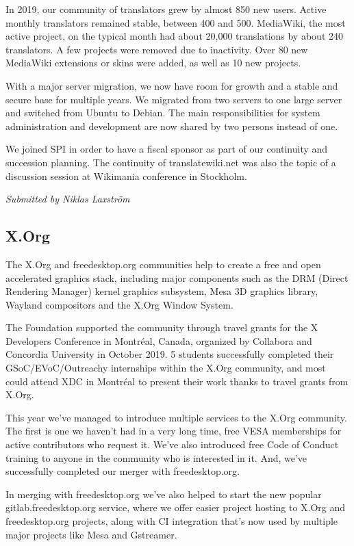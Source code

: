 \documentclass[a4paper]{report}
\begin{document}
In 2019, our community of translators grew by almost 850 new users.
Active monthly translators remained stable, between 400 and 500.
MediaWiki, the most active project, on the typical month had about
20,000 translations by about 240 translators. A few projects were
removed due to inactivity. Over 80 new MediaWiki extensions or skins
were added, as well as 10 new projects.

With a major server migration, we now have room for growth and a stable
and secure base for multiple years. We migrated from two servers to one
large server and switched from Ubuntu to Debian. The main
responsibilities for system administration and development are now
shared by two persons instead of one.

We joined SPI in order to have a fiscal sponsor as part of our
continuity and succession planning. The continuity of translatewiki.net
was also the topic of a discussion session at Wikimania conference in
Stockholm.

{\em Submitted by Niklas Laxström}

\subsection{X.Org}

The X.Org and freedesktop.org communities help to create a free and open
accelerated graphics stack, including major components such as the DRM
(Direct Rendering Manager) kernel graphics subsystem, Mesa 3D graphics
library, Wayland compositors and the X.Org Window System.

The Foundation supported the community through travel grants for the X
Developers Conference in Montréal, Canada, organized by Collabora and
Concordia University in October 2019. 5 students successfully completed
their GSoC/EVoC/Outreachy internships within the X.Org community, and
most could attend XDC in Montréal to present their work thanks to travel
grants from X.Org.

This year we've managed to introduce multiple services to the X.Org
community.  The first is one we haven't had in a very long time, free
VESA memberships for active contributors who request it. We've also
introduced free Code of Conduct training to anyone in the community who
is interested in it. And, we've successfully completed our merger with
freedesktop.org.

In merging with freedesktop.org we've also helped to start the new
popular gitlab.freedesktop.org service, where we offer easier project
hosting to X.Org and freedesktop.org projects, along with CI integration
that's now used by multiple major projects like Mesa and Gstreamer.
\end{document}
